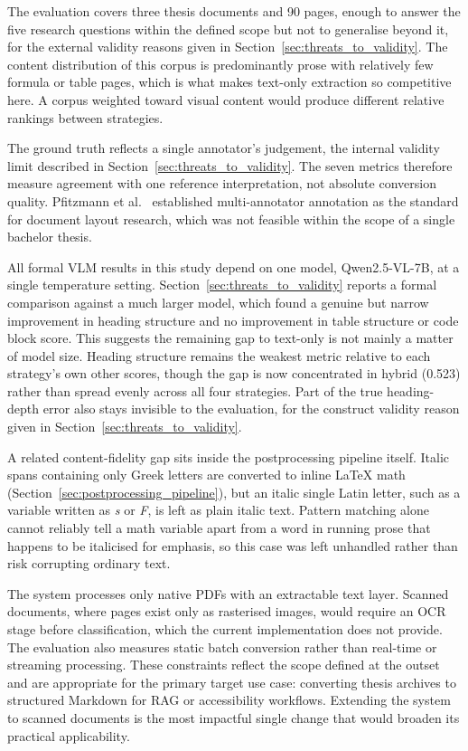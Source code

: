 The evaluation covers three thesis documents and 90 pages, enough to answer
the five research questions within the defined scope but not to generalise
beyond it, for the external validity reasons given in
Section~\ref{sec:threats_to_validity}. The content distribution of this
corpus is predominantly prose with relatively few formula or table pages,
which is what makes text-only extraction so competitive here. A corpus
weighted toward visual content would produce different relative rankings
between strategies.

The ground truth reflects a single annotator's judgement, the internal
validity limit described in Section~\ref{sec:threats_to_validity}. The seven
metrics therefore measure agreement with one reference interpretation, not
absolute conversion quality.
Pfitzmann et al.\ \autocite{pfitzmann2022} established multi-annotator annotation
as the standard for document layout research, which was not feasible within the
scope of a single bachelor thesis.

All formal VLM results in this study depend on one model, Qwen2.5-VL-7B, at a
single temperature setting. Section~\ref{sec:threats_to_validity} reports a
formal comparison against a much larger model, which found a genuine but
narrow improvement in heading structure and no improvement in table
structure or code block score. This suggests the remaining gap to text-only
is not mainly a matter of model size.
Heading structure remains the weakest metric relative to each strategy's own
other scores, though the gap is now concentrated in hybrid (0.523) rather
than spread evenly across all four strategies. Part of the true
heading-depth error also stays invisible to the evaluation, for the
construct validity reason given in Section~\ref{sec:threats_to_validity}.

A related content-fidelity gap sits inside the postprocessing pipeline
itself. Italic spans containing only Greek letters are converted to inline
LaTeX math (Section~\ref{sec:postprocessing_pipeline}), but an italic
single Latin letter, such as a variable written as \textit{s} or
\textit{F}, is left as plain italic text. Pattern matching alone cannot
reliably tell a math variable apart from a word in running prose that
happens to be italicised for emphasis, so this case was left unhandled
rather than risk corrupting ordinary text.

The system processes only native PDFs with an extractable text layer. Scanned
documents, where pages exist only as rasterised images, would require an OCR
stage before classification, which the current implementation does not provide.
The evaluation also measures static batch conversion rather than real-time or
streaming processing. These constraints reflect the scope defined at the outset
and are appropriate for the primary target use case: converting thesis archives to
structured Markdown for RAG or accessibility workflows. Extending the system to
scanned documents is the most impactful single change that would broaden its
practical applicability.

